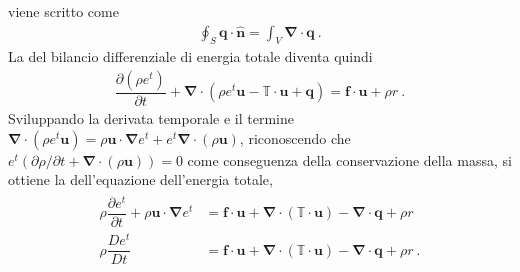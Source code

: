 \documentclass[letterpaper,10pt,italian]{jupyterBook}
\begin{document}
\sphinxAtStartPar
viene scritto come
\begin{equation*}
\begin{split}\oint_S \mathbf{q} \cdot \mathbf{\hat{n}} = \int_V \mathbf{\nabla} \cdot \mathbf{q} \ .\end{split}
\end{equation*}
\sphinxAtStartPar
La  del bilancio differenziale di energia totale
diventa quindi
\begin{equation*}
\begin{split}\dfrac{\partial (\rho e^t)}{\partial t} + \mathbf{\nabla} \cdot (\rho e^t \mathbf{u} - \mathbb{T} \cdot \mathbf{u} + \mathbf{q}) = \mathbf{f} \cdot \mathbf{u} + \rho r \ .\end{split}
\end{equation*}
\sphinxAtStartPar
Sviluppando la derivata temporale e il termine
\(\mathbf{\nabla} \cdot (\rho e^t \mathbf{u}) = \rho \mathbf{u} \cdot \mathbf{\nabla} e^t + e^t \mathbf{\nabla} \cdot (\rho \mathbf{u})\),
riconoscendo che
\(e^t (\partial \rho/\partial t + \mathbf{\nabla} \cdot (\rho \mathbf{u}))=0\)
come conseguenza della conservazione della massa, si ottiene la  dell’equazione dell’energia totale,
\begin{equation*}
\begin{split}\begin{aligned}
   \rho \dfrac{\partial e^t}{\partial t}  +  \rho \mathbf{u}  \cdot  \mathbf{\nabla} e^t & = \mathbf{f} \cdot \mathbf{u} + \mathbf{\nabla} \cdot ( \mathbb{T} \cdot \mathbf{u} ) - \mathbf{\nabla} \cdot \mathbf{q} + \rho r \\ 
   \rho \dfrac{D e^t}{D t} & =  \mathbf{f} \cdot \mathbf{u} + \mathbf{\nabla} \cdot ( \mathbb{T} \cdot \mathbf{u} ) - \mathbf{\nabla} \cdot \mathbf{q} + \rho r  \ . \\ 
  \end{aligned}\end{split}
\end{equation*}
\end{document}
